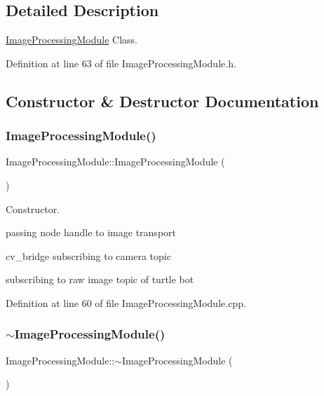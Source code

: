 \subsection{Detailed Description}
\mbox{\hyperlink{class_image_processing_module}{Image\+Processing\+Module}} Class. 

Definition at line 63 of file Image\+Processing\+Module.\+h.



\subsection{Constructor \& Destructor Documentation}
\mbox{\label{class_image_processing_module_a2c35e6db14ed55d6fc612076aaf1324b}} 
\subsubsection{\texorpdfstring{Image\+Processing\+Module()}{ImageProcessingModule()}}
{\footnotesize\ttfamily Image\+Processing\+Module\+::\+Image\+Processing\+Module (\begin{DoxyParamCaption}{ }\end{DoxyParamCaption})}



Constructor. 

passing node handle to image transport

cv\+\_\+bridge subscribing to camera topic

subscribing to raw image topic of turtle bot 

Definition at line 60 of file Image\+Processing\+Module.\+cpp.

\mbox{\label{class_image_processing_module_a5f5c41eb1df297c230c777a2cac6e56a}} 
\subsubsection{\texorpdfstring{$\sim$\+Image\+Processing\+Module()}{~ImageProcessingModule()}}
{\footnotesize\ttfamily Image\+Processing\+Module\+::$\sim$\+Image\+Processing\+Module (\begin{DoxyParamCaption}{ }\end{DoxyParamCaption})}



